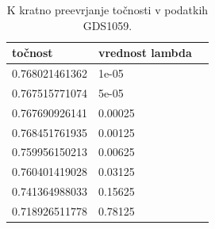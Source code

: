 \documentclass[a4paper,11pt]{article}
\begin{document}
\begin{table}[htbp]
\caption{K kratno preevrjanje točnosti v podatkih GDS1059.}
\label{tab2}
\begin{center}
\begin{tabular}{llp{3cm}}
\hline
točnost & vrednost lambda \\
\hline
0.768021461362 & 1e-05 \\
0.767515771074 & 5e-05 \\
0.767690926141 & 0.00025 \\
0.768451761935 & 0.00125 \\
0.759956150213 & 0.00625 \\
0.760401419028 & 0.03125 \\
0.741364988033 & 0.15625 \\
0.718926511778 & 0.78125 \\
\hline
\end{tabular}
\end{center}
\end{table}
\end{document}
